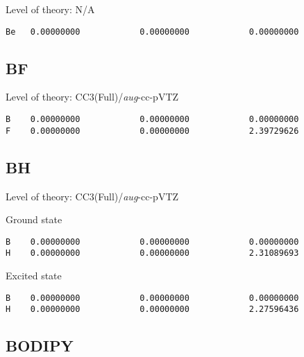 \documentclass[journal=jctcce,manuscript=article,layout=traditional]{achemso}
\newcommand{\AVTZ}{\emph{aug}-cc-pVTZ}
\begin{document}
\begin{singlespace}
Level of theory: N/A
\begin{verbatim}
Be   0.00000000            0.00000000            0.00000000
\end{verbatim}
\end{singlespace}

\subsection*{BF}

\begin{singlespace}
Level of theory: CC3(Full)/{\AVTZ}
\begin{verbatim}
B    0.00000000            0.00000000            0.00000000
F    0.00000000            0.00000000            2.39729626
\end{verbatim}
\end{singlespace}

\subsection*{BH}

\begin{singlespace}
Level of theory: CC3(Full)/{\AVTZ}
\end{singlespace}

\begin{singlespace}
\noindent Ground state
\begin{verbatim}
B    0.00000000            0.00000000            0.00000000
H    0.00000000            0.00000000            2.31089693
\end{verbatim}
\end{singlespace}

\begin{singlespace}
\noindent Excited state
\begin{verbatim}
B    0.00000000            0.00000000            0.00000000
H    0.00000000            0.00000000            2.27596436
\end{verbatim}
\end{singlespace}

\subsection*{BODIPY}
\end{document}
